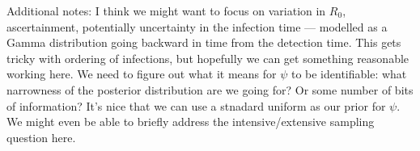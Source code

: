Additional notes: I think we might want to focus on variation in $R_0$, ascertainment, potentially uncertainty in the infection time --- modelled as a Gamma distribution going backward in time from the detection time. This gets tricky with ordering of infections, but hopefully we can get something reasonable working here. We need to figure out what it means for $\psi$ to be identifiable: what narrowness of the posterior distribution are we going for? Or some number of bits of information? It's nice that we can use a stnadard uniform as our prior for $\psi$. We might even be able to briefly address the intensive/extensive sampling question here. 